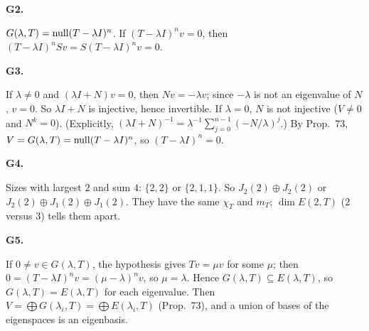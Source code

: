 \documentclass[10pt]{scrartcl}
\begin{document}
\begin{prob}
\textbf{G2. }\par 
{}
$G(\lambda,T)=\operatorname{null}(T-\lambda I)^n$. If $(T-\lambda I)^nv=0$, then $(T-\lambda I)^nSv=S(T-\lambda I)^nv=0$.
\end{prob}

\begin{prob}
\textbf{G3. }\par 
\begin{enumerate}[(a)]
  \ii {}
  If $\lambda\ne0$ and $(\lambda I+N)v=0$, then $Nv=-\lambda v$; since $-\lambda$ is not an eigenvalue of $N$, $v=0$. So $\lambda I+N$ is injective, hence invertible. If $\lambda=0$, $N$ is not injective ($V\ne0$ and $N^k=0$). (Explicitly, $(\lambda I+N)^{-1}=\lambda^{-1}\sum_{j=0}^{n-1}(-N/\lambda)^j$.)
  \ii {}
  By Prop.~73, $V=G(\lambda,T)=\operatorname{null}(T-\lambda I)^n$, so $(T-\lambda I)^n=0$.
\end{enumerate}
\end{prob}

\begin{prob}
\textbf{G4. }\par 
{}
Sizes with largest $2$ and sum $4$: $\{2,2\}$ or $\{2,1,1\}$. So $J_2(2)\oplus J_2(2)$ or $J_2(2)\oplus J_1(2)\oplus J_1(2)$. They have the same $\chi_T$ and $m_T$; $\dim E(2,T)$ ($2$ versus $3$) tells them apart.
\end{prob}

\begin{prob}
\textbf{G5. }\par 
{}
If $0\ne v\in G(\lambda,T)$, the hypothesis gives $Tv=\mu v$ for some $\mu$; then $0=(T-\lambda I)^nv=(\mu-\lambda)^nv$, so $\mu=\lambda$. Hence $G(\lambda,T)\subseteq E(\lambda,T)$, so $G(\lambda,T)=E(\lambda,T)$ for each eigenvalue. Then $V=\bigoplus G(\lambda_i,T)=\bigoplus E(\lambda_i,T)$ (Prop.~73), and a union of bases of the eigenspaces is an eigenbasis.
\end{prob}
\end{document}
